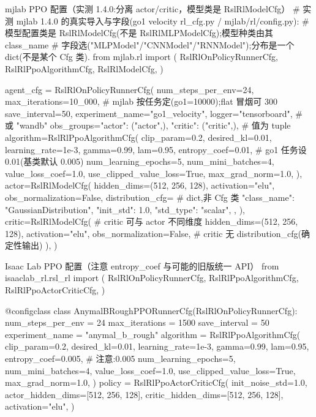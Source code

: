 \begin{codebox}[Python]{mjlab PPO 配置（实测 1.4.0:分离 actor/critic，模型类是 RslRlModelCfg）}
# 实测 mjlab 1.4.0 的真实导入与字段(go1 velocity rl_cfg.py / mjlab/rl/config.py):
#   模型配置类是 RslRlModelCfg(不是 RslRlMLPModelCfg);模型种类由其 class_name
#   字段选("MLPModel"/"CNNModel"/"RNNModel");分布是一个 dict(不是某个 Cfg 类).
from mjlab.rl import (
    RslRlOnPolicyRunnerCfg, RslRlPpoAlgorithmCfg, RslRlModelCfg,
)

agent_cfg = RslRlOnPolicyRunnerCfg(
    num_steps_per_env=24,
    max_iterations=10_000,         # mjlab 按任务定(go1=10000);flat 冒烟可 300
    save_interval=50,
    experiment_name="go1_velocity",
    logger="tensorboard",          # 或 "wandb"
    obs_groups={"actor": ("actor",), "critic": ("critic",)},  # 值为 tuple
    algorithm=RslRlPpoAlgorithmCfg(
        clip_param=0.2, desired_kl=0.01, learning_rate=1e-3,
        gamma=0.99, lam=0.95, entropy_coef=0.01,   # go1 任务设 0.01(基类默认 0.005)
        num_learning_epochs=5, num_mini_batches=4,
        value_loss_coef=1.0, use_clipped_value_loss=True, max_grad_norm=1.0,
    ),
    actor=RslRlModelCfg(
        hidden_dims=(512, 256, 128), activation="elu",
        obs_normalization=False,
        distribution_cfg={                       # dict,非 Cfg 类
            "class_name": "GaussianDistribution",
            "init_std": 1.0, "std_type": "scalar",
        },
    ),
    critic=RslRlModelCfg(              # critic 可与 actor 不同维度
        hidden_dims=(512, 256, 128), activation="elu",
        obs_normalization=False,        # critic 无 distribution_cfg(确定性输出)
    ),
)
\end{codebox}

\begin{codebox}[Python]{Isaac Lab PPO 配置（注意 entropy\_coef 与可能的旧版统一 API）}
from isaaclab_rl.rsl_rl import (
    RslRlOnPolicyRunnerCfg, RslRlPpoAlgorithmCfg, RslRlPpoActorCriticCfg,
)

@configclass
class AnymalBRoughPPORunnerCfg(RslRlOnPolicyRunnerCfg):
    num_steps_per_env = 24
    max_iterations = 1500
    save_interval = 50
    experiment_name = "anymal_b_rough"
    algorithm = RslRlPpoAlgorithmCfg(
        clip_param=0.2, desired_kl=0.01, learning_rate=1e-3,
        gamma=0.99, lam=0.95, entropy_coef=0.005,   # 注意:0.005
        num_learning_epochs=5, num_mini_batches=4,
        value_loss_coef=1.0, use_clipped_value_loss=True, max_grad_norm=1.0,
    )
    policy = RslRlPpoActorCriticCfg(
        init_noise_std=1.0,
        actor_hidden_dims=[512, 256, 128],
        critic_hidden_dims=[512, 256, 128],
        activation="elu",
    )
\end{codebox}

